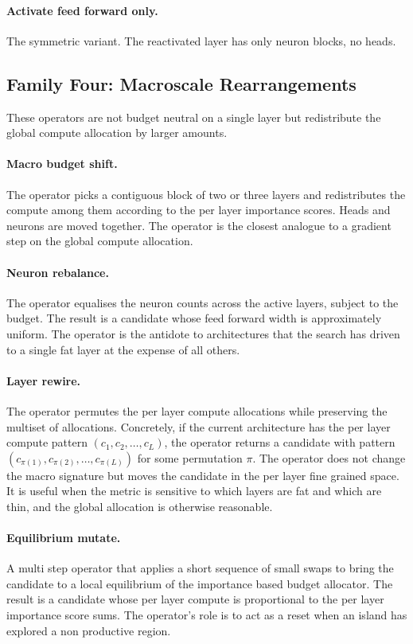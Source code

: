 \paragraph{Activate feed forward only.} The symmetric variant. The reactivated layer has only neuron blocks, no heads.

\subsection{Family Four: Macroscale Rearrangements}

These operators are not budget neutral on a single layer but redistribute the global compute allocation by larger amounts.

\paragraph{Macro budget shift.} The operator picks a contiguous block of two or three layers and redistributes the compute among them according to the per layer importance scores. Heads and neurons are moved together. The operator is the closest analogue to a gradient step on the global compute allocation.

\paragraph{Neuron rebalance.} The operator equalises the neuron counts across the active layers, subject to the budget. The result is a candidate whose feed forward width is approximately uniform. The operator is the antidote to architectures that the search has driven to a single fat layer at the expense of all others.

\paragraph{Layer rewire.} The operator permutes the per layer compute allocations while preserving the multiset of allocations. Concretely, if the current architecture has the per layer compute pattern $(c_1, c_2, \ldots, c_L)$, the operator returns a candidate with pattern $(c_{\pi(1)}, c_{\pi(2)}, \ldots, c_{\pi(L)})$ for some permutation $\pi$. The operator does not change the macro signature but moves the candidate in the per layer fine grained space. It is useful when the metric is sensitive to which layers are fat and which are thin, and the global allocation is otherwise reasonable.

\paragraph{Equilibrium mutate.} A multi step operator that applies a short sequence of small swaps to bring the candidate to a local equilibrium of the importance based budget allocator. The result is a candidate whose per layer compute is proportional to the per layer importance score sums. The operator's role is to act as a reset when an island has explored a non productive region.

